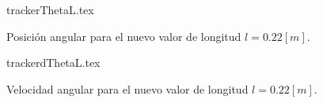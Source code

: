 \begin{figure}[htb!]
 \centering
{trackerThetaL.tex}
 \caption{Posición angular para el nuevo valor de longitud $l = 0.22 [m]$.}
 \label{fig: time tracker theta new length}
\end{figure}

\begin{figure}[htb!]
 \centering
{trackerdThetaL.tex}
 \caption{Velocidad angular para el nuevo valor de longitud $l = 0.22 [m]$.}
 \label{fig: time tracker dtheta new length}
\end{figure}



\clearpage
